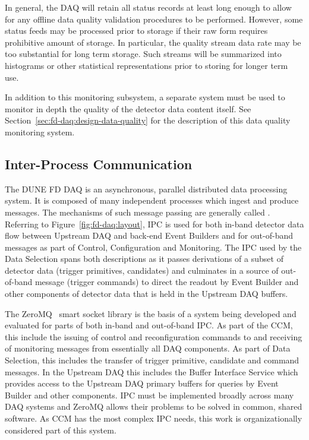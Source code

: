 In general, the DAQ will retain all status records at least long enough to allow for any offline data quality validation procedures to be performed. 
However, some status feeds may be processed prior to storage if their raw form requires prohibitive amount of storage. 
In particular, the quality stream data rate may be too substantial for long term storage. 
Such streams will be summarized into histograms or other statistical representations prior to storing for longer term use.

In addition to this   monitoring subsystem, a separate system must be used to monitor in depth the quality of the detector data content itself. 
See Section~\ref{sec:fd-daq:design-data-quality} for the description of this data quality monitoring system.

\subsection{Inter-Process Communication}
\label{sec:daq:design-ipc}

The DUNE FD DAQ is an asynchronous, parallel distributed data processing system. 
It is composed of many independent processes which ingest and produce messages. 
The mechanisms of such message passing are generally called . 
Referring to Figure~\ref{fig:fd-daq:layout}, IPC is used for both in-band detector data flow between Upstream DAQ and back-end Event Builders and for out-of-band messages as part of Control, Configuration and Monitoring.  The IPC used by the Data Selection spans both descriptions as it passes derivations of a subset of detector data (trigger primitives, candidates) and culminates in a source of out-of-band message (trigger commands) to direct the readout by Event Builder and other components of detector data that is held in the Upstream DAQ buffers.

The ZeroMQ~\cite{zeromq} smart socket library is the basis of a system being developed and evaluated for parts of both in-band and out-of-band IPC. 
As part of the CCM, this include the issuing of control and reconfiguration commands to and receiving of monitoring messages from essentially all DAQ components. 
As part of Data Selection, this includes the transfer of trigger primitive, candidate and command messages. 
In the Upstream DAQ this includes the Buffer Interface Service which provides access to the Upstream DAQ primary buffers for queries by Event Builder and other components. 
IPC must be implemented broadly across many DAQ systems and ZeroMQ allows their problems to be solved in common, shared software.  As CCM has the most complex IPC needs, this work is organizationally considered part of this system.

